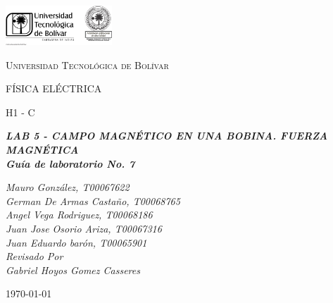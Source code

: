 \documentclass[letterpaper, 12pt]{article}
\begin{document}

\begin{titlepage}
	\centering
	\includegraphics[width=0.3\textwidth]{Images/logo_utb.png}\par\vspace{1cm}
	{\scshape\LARGE Universidad Tecnológica de Bolívar \par}
	\vspace{1cm}

	{\scshape\Large FÍSICA ELÉCTRICA \par}
	\vspace{.2cm}

	{\scshape\Large H1 - C \par}
	\vspace{1cm}
	\slshape {\Large \bfseries{} LAB 5 - CAMPO MAGNÉTICO EN UNA BOBINA. FUERZA MAGNÉTICA\\}
	\slshape {\small \bfseries{} Guía de laboratorio No. 7}
	\vspace{1cm}

	\slshape {\itshape{} Mauro González, T00067622 \\}
	\slshape {\itshape{} German De Armas Castaño, T00068765 \\}
	\slshape {\itshape{} Angel Vega Rodriguez, T00068186 \\}
	\slshape {\itshape{} Juan Jose Osorio Ariza, T00067316 \\}
	\slshape {\itshape{} Juan Eduardo barón, T00065901 \\}
	\vfill
	Revisado Por \\
	Gabriel Hoyos Gomez Casseres\\
	{\large \today\par}
\end{titlepage}
\end{document}
